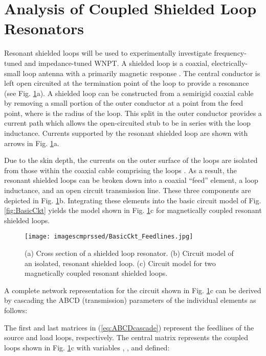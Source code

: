\documentclass[journal]{IEEEtran}
\begin{document}
\section{Analysis of Coupled Shielded Loop Resonators}
\label{sec:ShieldedLoop}

Resonant shielded loops will be used to experimentally investigate frequency-tuned and impedance-tuned WNPT. A shielded loop is a coaxial, electrically-small loop antenna with a primarily magnetic response \cite{ShieldedLoop-Stendgaard2, ShieldedLoop-Harpen}. The central conductor is left open circuited at the termination point of the loop to provide a resonance (see Fig. \ref{fig:circuit}a). A shielded loop  can be constructed from a semirigid coaxial cable by removing a small portion of the outer conductor at a point  from the feed point, where  is the radius of the loop. This split in the outer conductor provides a current path which allows the open-circuited stub to be in series with the loop inductance. Currents supported by the resonant shielded loop are shown with arrows in Fig. \ref{fig:circuit}a.

Due to the skin depth, the currents on the outer surface of the loops are isolated from those within the coaxial cable comprising the loops \cite{ShieldedLoop-Stendgaard}. As a result, the resonant shielded loops can be broken down into a coaxial ``feed'' element, a loop inductance, and an open circuit transmission line. These three components are depicted in Fig. \ref{fig:circuit}b. Integrating these elements into the basic circuit model of Fig. \ref{fig:BasicCkt} yields the model shown in Fig. \ref{fig:circuit}c for magnetically coupled resonant shielded loops.
\begin{figure}[htbp]
    \centering
    \texttt{[image: imagescmprssed/BasicCkt\_Feedlines.jpg]}
    \caption{(a) Cross section of a shielded loop resonator. (b) Circuit model of an isolated, resonant shielded loop. (c) Circuit model for two magnetically coupled resonant shielded loops.}
    \label{fig:circuit}
\end{figure}

A complete network representation for the circuit shown in Fig. \ref{fig:circuit}c can be derived by cascading the ABCD (transmission) parameters of the individual elements as follows:

The first and last matrices in (\ref{eq:ABCDcascade}) represent the feedlines of the source and load loops, respectively. The central matrix represents the coupled loops shown in Fig. \ref{fig:circuit}c \cite{Pozar} with variables , , and  defined:
\end{document}
